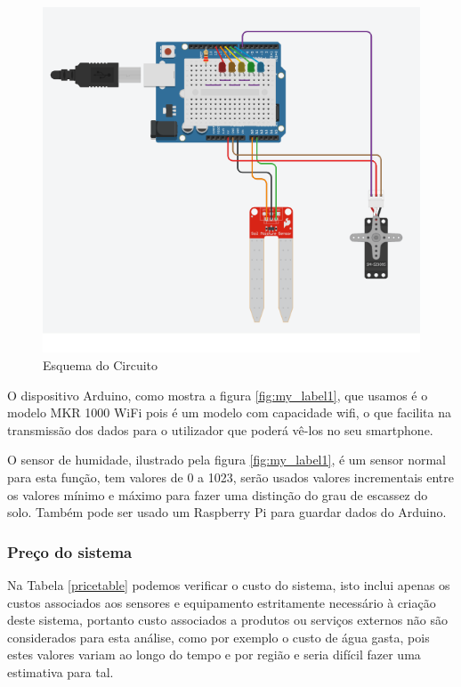 \documentclass[conference]{IEEEtran}
\begin{document}
\begin{figure}
    \centering
    \includegraphics[scale=0.5]{soil_moisture_circuit_schema.png}
    \caption{Esquema do Circuito}
    \label{fig:circuit}
\end{figure}

O dispositivo Arduino, como mostra a figura \ref{fig:my_label1}, que usamos é o 
modelo MKR 1000 WiFi pois é um modelo com capacidade wifi, o que facilita na 
transmissão dos dados para o utilizador que poderá vê-los no seu smartphone. 

O sensor de humidade, ilustrado pela figura \ref{fig:my_label1}, é um 
sensor normal para esta função, tem valores de 0 a 1023, serão usados valores 
incrementais entre os valores mínimo e máximo para fazer uma distinção do grau 
de escassez do solo. Também pode ser usado um Raspberry Pi para guardar dados do Arduino.

\subsubsection{Preço do sistema}

Na Tabela \ref{pricetable} podemos verificar o custo do sistema, isto inclui apenas
os custos associados aos sensores e equipamento estritamente necessário à criação deste sistema, 
portanto custo associados a produtos ou serviços externos não são considerados para esta análise, 
como por exemplo o custo de água gasta, pois estes valores variam ao longo do tempo e por 
região e seria difícil fazer uma estimativa para tal.
\end{document}
